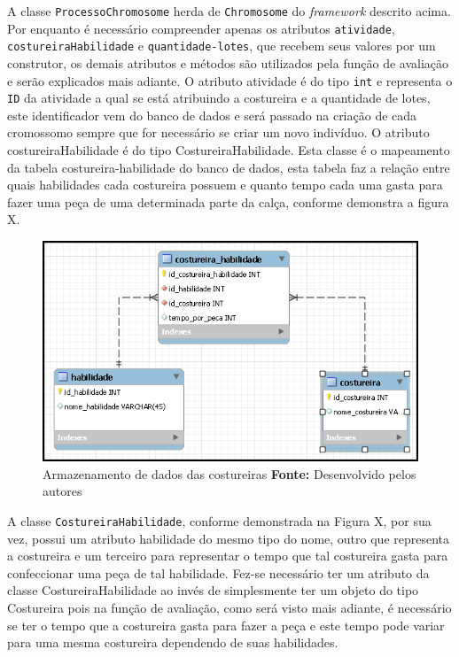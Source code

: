 \par A classe \texttt{ProcessoChromosome} herda de \texttt{Chromosome} do \textit{framework} descrito acima. Por enquanto
é necessário compreender apenas os atributos \texttt{atividade}, \texttt{costureiraHabilidade} e \texttt{quantidade-lotes}, 
que recebem seus valores por um construtor, os demais atributos e métodos são utilizados pela função de avaliação e serão 
explicados mais adiante. O atributo atividade é do tipo \texttt{int} e representa o \texttt{ID} da atividade a qual se está
atribuindo a costureira e a quantidade de lotes, este identificador vem do banco de dados e será passado na criação de cada cromossomo
sempre que for necessário se criar um novo indivíduo. O atributo costureiraHabilidade é do tipo CostureiraHabilidade. Esta classe
é o mapeamento da tabela costureira-habilidade do banco de dados, esta tabela faz a relação entre quais habilidades cada costureira
possuem e quanto tempo cada uma gasta para fazer uma peça de uma determinada parte da calça, conforme demonstra a figura X.


\begin{figure}[h!]
	\centerline{\includegraphics[scale=0.9]{./imagens/costureira_habilidade_tabela.png}}
	\caption[Tabela costureira-habilidade]
	{Armazenamento de dados das costureiras \textbf{Fonte:} Desenvolvido pelos autores}
	\label{fig:exemplo1}
\end{figure}


\par A classe \texttt{CostureiraHabilidade}, conforme demonstrada na Figura X, por sua vez, possui um atributo habilidade 
do mesmo tipo do nome, outro que representa a costureira e um terceiro para representar o tempo que tal costureira gasta para 
confeccionar uma peça de tal habilidade. Fez-se necessário ter um atributo da classe CostureiraHabilidade ao invés de simplesmente 
ter um objeto do tipo Costureira pois na função de avaliação, como será visto mais adiante, é necessário se ter o tempo que a costureira gasta para fazer a peça e este tempo pode variar para uma mesma costureira dependendo de suas habilidades. 


